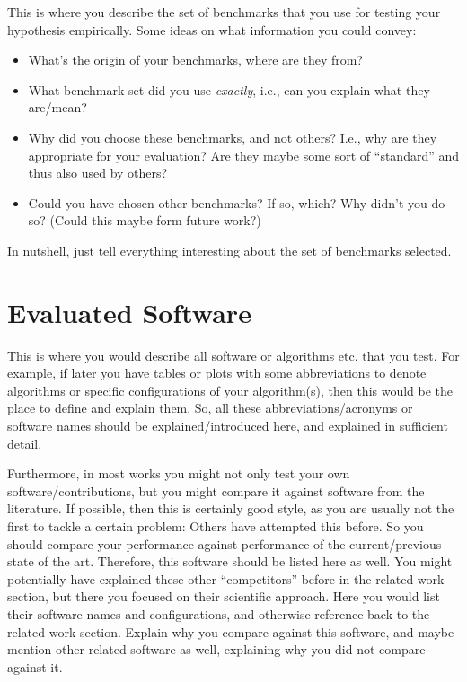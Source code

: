 This is where you describe the set of benchmarks that you use for testing your hypothesis empirically. Some ideas on what information you could convey:

\begin{itemize}
  \item What's the origin of your benchmarks, where are they from?
  \item What benchmark set did you use \emph{exactly}, i.e., can you explain what they are/mean?
  \item Why did you choose these benchmarks, and not others? I.e., why are they appropriate for your evaluation? Are they maybe some sort of ``standard'' and thus also used by others?
  \item Could you have chosen other benchmarks? If so, which? Why didn't you do so? (Could this maybe form future work?)
\end{itemize}

In nutshell, just tell everything interesting about the set of benchmarks selected.


\section{Evaluated Software}

This is where you would describe all software or algorithms etc. that you test. For example, if later you have tables or plots with some abbreviations to denote algorithms or specific configurations of your algorithm(s), then this would be the place to define and explain them. So, all these abbreviations/acronyms or software names should be explained/introduced here, and explained in sufficient detail.

Furthermore, in most works you might not only test your own software/contributions, but you might compare it against software from the literature. If possible, then this is certainly good style, as you are usually not the first to tackle a certain problem: Others have attempted this before. So you should compare your performance against performance of the current/previous state of the art. Therefore, this software should be listed here as well. You might potentially have explained these other ``competitors'' before in the related work section, but there you focused on their scientific approach. Here you would list their software names and configurations, and otherwise reference back to the related work section. Explain why you compare against this software, and maybe mention other related software as well, explaining why you did not compare against it.


